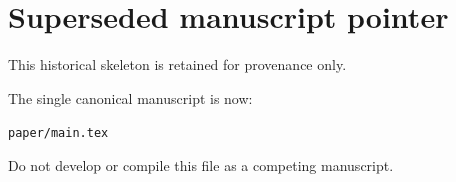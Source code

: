 \documentclass[11pt]{article}
\begin{document}
\section*{Superseded manuscript pointer}
This historical skeleton is retained for provenance only.

The single canonical manuscript is now:
\begin{center}
\texttt{paper/main.tex}
\end{center}

Do not develop or compile this file as a competing manuscript.
\end{document}
